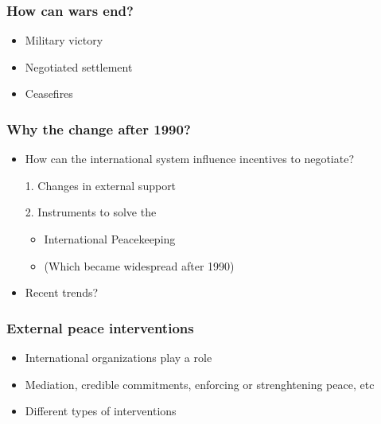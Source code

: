 \documentclass[aspectratio=43]{beamer}
\begin{document}

\begin{frame}
\frametitle{How can wars end?}
\centering

\begin{itemize}[<+->]
  \item Military victory
  \item Negotiated settlement
  \item Ceasefires
\end{itemize}

\end{frame}


\begin{frame}
\frametitle{Why the change after 1990?}
\centering

\begin{itemize}[<+->]
  \item How can the international system influence incentives to negotiate?
  \item[1.] Changes in external support
  \item[2.] Instruments to solve the {\color{red}{credible commitment problem}}
  \begin{itemize}
    \item International Peacekeeping
    \item (Which became widespread after 1990)
  \end{itemize}
  \item Recent trends?
\end{itemize}

\end{frame}

\begin{frame}
\frametitle{External peace interventions}
\centering

\begin{itemize}
  \item International organizations play a role
  \item Mediation, credible commitments, enforcing or strenghtening peace, etc
  \item Different types of interventions
\end{itemize}

\end{frame}
\end{document}
